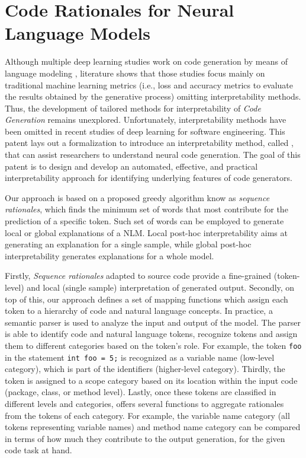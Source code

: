 \chapter{Code Rationales for \break Neural Language Models}
\label{ch8:rationales}

Although multiple deep learning studies work on code generation by means of language modeling \cite{Cruz-Benito}, literature shows that those studies focus mainly on traditional machine learning metrics  (i.e., loss and accuracy metrics to evaluate the results obtained by the generative process) omitting interpretability methods. Thus, the development of tailored methods for interpretability of \textit{Code Generation} remains unexplored. Unfortunately, interpretability methods have been omitted in recent studies of deep learning for software engineering. This patent lays out a formalization to introduce an interpretability method, called \codeSeqRational, that can assist researchers to understand neural code generation. The goal of this patent is to design and develop an automated, effective, and practical interpretability approach for identifying underlying features of code generators. 

Our approach \codeSeqRational is based on a proposed greedy algorithm know as \textit{sequence rationales}\cite{vafa2021rationales}, which finds the minimum set of words that most contribute for the prediction of a specific token. Such set of words can be employed to generate local or global explanations of a NLM. Local post-hoc interpretability aims at generating an explanation for a single sample, while global post-hoc interpretability generates explanations for a whole model. 

Firstly, \textit{Sequence rationales} adapted to source code provide a fine-grained (token-level) and local (single sample) interpretation of generated output. Secondly, on top of this, our approach defines a set of mapping functions which assign each token to a hierarchy of code and natural language concepts. In practice, a semantic parser is used to analyze the input and output of the model. The parser is able to identify code and natural language tokens, recognize tokens and assign them to different categories based on the token's role. For example, the token \texttt{foo} in the statement \texttt{int foo = 5;} is recognized as a variable name (low-level category), which is part of the identifiers (higher-level category). Thirdly, the token is assigned to a scope category based on its location within the input code (\eg package, class, or method level). Lastly, once these tokens are classified in different levels and categories, \codeSeqRational offers several functions to aggregate rationales from the tokens of each category. For example, the variable name category (\ie all tokens representing variable names) and method name category can be compared in terms of how much they contribute to the output generation, for the given code task at hand.

